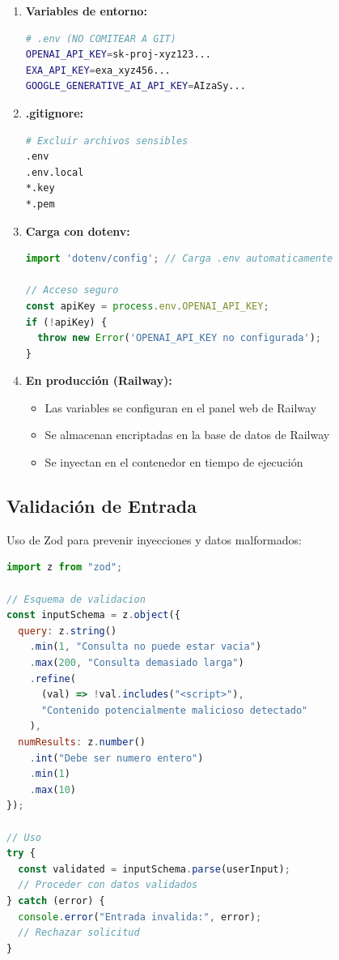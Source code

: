\documentclass[12pt,a4paper]{article}
\begin{document}
\begin{enumerate}
    \item \textbf{Variables de entorno:}
    \begin{lstlisting}[language=bash]
# .env (NO COMITEAR A GIT)
OPENAI_API_KEY=sk-proj-xyz123...
EXA_API_KEY=exa_xyz456...
GOOGLE_GENERATIVE_AI_API_KEY=AIzaSy...
    \end{lstlisting}

    \item \textbf{.gitignore:}
    \begin{lstlisting}[language=bash]
# Excluir archivos sensibles
.env
.env.local
*.key
*.pem
    \end{lstlisting}

    \item \textbf{Carga con dotenv:}
    \begin{lstlisting}[language=JavaScript]
import 'dotenv/config'; // Carga .env automaticamente

// Acceso seguro
const apiKey = process.env.OPENAI_API_KEY;
if (!apiKey) {
  throw new Error('OPENAI_API_KEY no configurada');
}
    \end{lstlisting}

    \item \textbf{En producción (Railway):}
    \begin{itemize}
        \item Las variables se configuran en el panel web de Railway
        \item Se almacenan encriptadas en la base de datos de Railway
        \item Se inyectan en el contenedor en tiempo de ejecución
    \end{itemize}
\end{enumerate}

\subsection{Validación de Entrada}

Uso de Zod para prevenir inyecciones y datos malformados:

\begin{lstlisting}[language=JavaScript]
import z from "zod";

// Esquema de validacion
const inputSchema = z.object({
  query: z.string()
    .min(1, "Consulta no puede estar vacia")
    .max(200, "Consulta demasiado larga")
    .refine(
      (val) => !val.includes("<script>"),
      "Contenido potencialmente malicioso detectado"
    ),
  numResults: z.number()
    .int("Debe ser numero entero")
    .min(1)
    .max(10)
});

// Uso
try {
  const validated = inputSchema.parse(userInput);
  // Proceder con datos validados
} catch (error) {
  console.error("Entrada invalida:", error);
  // Rechazar solicitud
}
\end{lstlisting}
\end{document}
